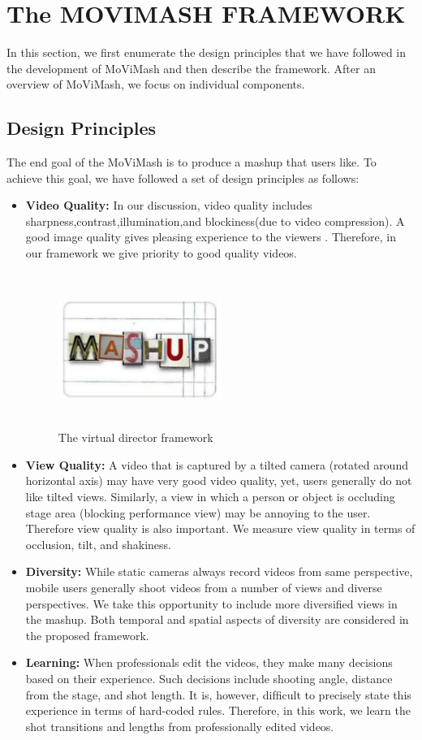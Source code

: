 \documentclass{sig-alternate}
\begin{document}
\section{The MOVIMASH FRAMEWORK}
In this section, we ﬁrst enumerate the design principles that we have followed in the development of MoViMash and then describe the framework. After an overview of MoViMash, we focus on individual components.



\subsection{Design Principles}
The end goal of the MoViMash is to produce a mashup that users like. To achieve this goal, we have followed a set of design principles as follows:
\begin{itemize}
\item  \textbf{Video Quality:} In our discussion, video quality includes sharpness,contrast,illumination,and blockiness(due to video compression). A good image quality gives pleasing experience to the viewers \cite{piron1976foundations}. Therefore, in our framework we give priority to good quality videos. 
 \begin{figure}[h]
\includegraphics[width=0.5\textwidth ,height = 5cm]{11}
\caption{The virtual director framework}
\label{fig:figure2}
\end{figure}

\item \textbf{View Quality:} A video that is captured by a tilted camera (rotated around horizontal axis) may have very good video quality, yet, users generally do not like tilted views. Similarly, a view in which a person or object is occluding stage area (blocking performance view) may be annoying to the user. Therefore view quality is also important. We measure view quality in terms of occlusion, tilt, and shakiness. 
\item \textbf{Diversity:} While static cameras always record videos from same perspective, mobile users generally shoot videos from a number of views and diverse perspectives. We take this opportunity to include more diversiﬁed views in the mashup. Both temporal and spatial aspects of diversity are considered in the proposed framework. 
\item \textbf{Learning:} When professionals edit the videos, they make many decisions based on their experience. Such decisions include shooting angle, distance from the stage, and shot length. It is, however, difﬁcult to precisely state this experience in terms of hard-coded rules. Therefore, in this work, we learn the shot transitions and lengths from professionally edited videos.
\end{itemize}
\end{document}
